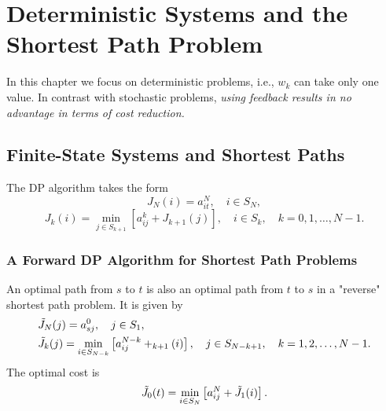 \chapter{Deterministic Systems and the Shortest Path Problem}
In this chapter we focus on deterministic problems, i.e., $w_k$ can take only one value. In contrast with stochastic problems, \textit{using feedback results in no advantage in terms of cost reduction.} 

\section{Finite-State Systems and Shortest Paths}
The DP algorithm takes the form 
\begin{equation}
    J_N(i)=a_{it}^N,\quad i\in S_N,
\end{equation}
\begin{equation}
    J_k(i)=\min_{j\in S_{k+1}}\left[a_{ij}^k+J_{k+1}(j)\right],\quad i\in S_k,\quad k=0,1,\dots,N-1.
\end{equation}
\subsection*{A Forward DP Algorithm for Shortest Path Problems}
An optimal path from $s$ to $t$ is also an optimal path from $t$ to $s$ in a "reverse" shortest path problem. It is given by 
\begin{align}
    &\Tilde{J}_N(j)=a_{sj}^0,\quad j\in S_1,\\
    &\Tilde{J}_k(j)=\min_{i\in S_{N-k}}\left[a_{ij}^{N-k}+\title{J}_{k+1}(i)\right],\quad j\in S_{N-k+1},\quad k=1,2,\dots,N-1.
\end{align}
The optimal cost is 
$$\Tilde{J}_0(t)=\min_{i\in S_N}\left[a_{ij}^N+\Tilde{J}_1(i)\right].$$